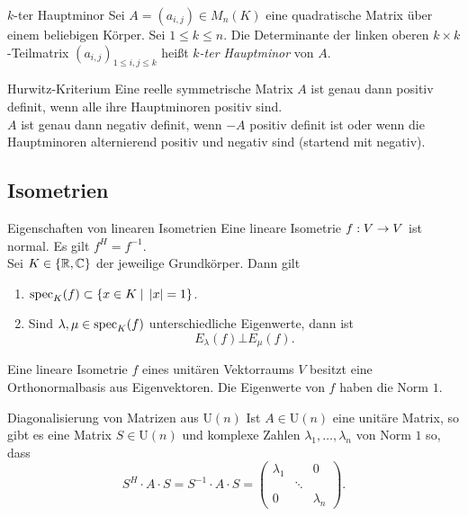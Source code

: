 \documentclass[main.tex]{subfiles}
\begin{document}
\begin{karte}{\(k\)-ter Hauptminor}
    Sei \(A = (a_{i,j}) \in M_n(K)\) eine 
    quadratische Matrix über einem beliebigen Körper. 
    Sei \( 1 \leq k\leq n \). Die Determinante der 
    linken oberen \( k\times k \)-Teilmatrix 
    \( (a_{i,j})_{1\leq i,j \leq k} \) heißt 
    \textit{\(k\)-ter Hauptminor} von \(A\).
\end{karte}

\begin{karte}{Hurwitz-Kriterium}
    Eine reelle symmetrische Matrix \(A\) ist genau dann 
    positiv definit, wenn alle ihre Hauptminoren 
    positiv sind.\\
    \(A\) ist genau dann negativ definit, wenn 
    \(-A\) positiv definit ist oder 
    wenn die Hauptminoren alternierend positiv und 
    negativ sind (startend mit negativ).
\end{karte}

\subsection*{Isometrien}

\begin{karte}{Eigenschaften von linearen Isometrien}
    Eine lineare Isometrie \( f : V \rightarrow V \)
    ist normal. Es gilt \( f^H = f^{-1} \).\\
    Sei \( K\in \{\mathbb{R}, \mathbb{C}\} \) der jeweilige 
    Grundkörper. Dann gilt
    \begin{enumerate}
        \item \( \operatorname{spec}_K(f) \subset \{ x\in K \;\vert\; 
        \left| x \right| = 1 \} \).
        \item Sind \(\lambda, \mu\in\operatorname{spec}_K(f)\) 
        unterschiedliche Eigenwerte, dann ist 
        \[ E_\lambda(f) \bot E_\mu(f). \]
    \end{enumerate}
    Eine lineare Isometrie \(f\) eines unitären 
    Vektorraums \(V\) besitzt eine Orthonormalbasis 
    aus Eigenvektoren. Die Eigenwerte von \(f\) 
    haben die Norm \(1\).
\end{karte}

\begin{karte}{Diagonalisierung von Matrizen aus \(\mathrm{U}(n)\)}
    Ist \(A\in \mathrm{U}(n)\) eine unitäre Matrix, 
    so gibt es eine Matrix \( S \in \mathrm{U}(n) \) 
    und komplexe Zahlen \( \lambda_1, \ldots, \lambda_n \) 
    von Norm \(1\) so, dass 
    \[ S^H \cdot A \cdot S = S^{-1} \cdot A \cdot S 
    = \begin{pmatrix}
        \lambda_1 && 0 \\
        & \ddots & \\
        0 && \lambda_n
    \end{pmatrix}. \]
\end{karte}
\end{document}
